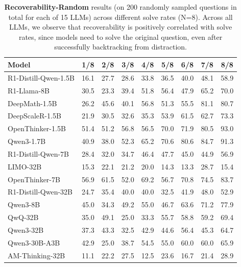 \documentclass{article} %
\begin{document}
\begin{table}[t]
  \centering
  \small
  \begin{tabular}{l|cccccccc}
    \toprule
    \textbf{Model} &
    \textbf{1/8} & \textbf{2/8} & \textbf{3/8} & \textbf{4/8} &
    \textbf{5/8} & \textbf{6/8} & \textbf{7/8} & \textbf{8/8} \\
    \midrule
    R1-Distill-Qwen-1.5B        & 16.1 & 27.7 & 28.6 & 33.8 & 36.5 & 40.0 & 48.1 & 58.9 \\
    R1-Llama-8B         & 30.5 & 23.3 & 39.4 & 51.8 & 56.4 & 47.9 & 65.2 & 70.0 \\
    DeepMath-1.5B       & 26.2 & 45.6 & 40.1 & 56.8 & 51.3 & 55.5 & 81.1 & 80.7 \\
    DeepScaleR-1.5B     & 21.9 & 30.5 & 32.6 & 35.3 & 53.9 & 61.5 & 62.7 & 73.3 \\
    OpenThinker-1.5B    & 51.4 & 51.2 & 56.8 & 56.5 & 70.0 & 71.9 & 80.5 & 93.0 \\
    Qwen3-1.7B          & 40.9 & 38.0 & 52.3 & 65.2 & 70.6 & 80.6 & 84.7 & 91.3 \\
    \midrule
    R1-Distill-Qwen-7B          & 28.4 & 32.0 & 34.7 & 46.4 & 47.7 & 45.0 & 44.9 & 56.9 \\
    LIMO-32B            & 15.3 & 22.1 & 21.2 & 20.0 & 14.3 & 13.3 & 28.7 & 15.4 \\
    OpenThinker-7B      & 56.9 & 61.5 & 52.0 & 69.2 & 56.7 & 70.8 & 74.5 & 83.7 \\
    R1-Distill-Qwen-32B         & 24.7 & 35.4 & 40.0 & 40.0 & 32.5 & 41.9 & 48.0 & 52.9 \\
    \midrule
    Qwen3-8B            & 45.0 & 34.3 & 49.2 & 55.0 & 46.7 & 63.6 & 71.2 & 77.9 \\
    QwQ-32B             & 35.0 & 49.1 & 25.0 & 33.3 & 55.7 & 58.8 & 59.2 & 69.4 \\
    Qwen3-32B           & 37.3 & 43.3 & 32.5 & 42.9 & 44.6 & 56.4 & 45.3 & 64.7 \\
    Qwen3-30B-A3B           & 42.9 & 25.0 & 38.7 & 54.5 & 55.0 & 60.0 & 60.0 & 65.9 \\
    AM-Thinking-32B     & 11.1 & 22.2 & 27.5 & 12.5 & 23.6 & 16.7 & 21.4 & 28.9 \\
    \bottomrule
  \end{tabular}
  \caption{\textbf{Recoverability-Random} results (on 200 randomly sampled questions in total for each of 15 LLMs) across different solve rates (N=8). Across all LLMs, we observe that recoverability is positively correlated with solve rates, since models need to solve the original question, even after successfully backtracking from distraction.}
  \label{tab:sr_curve_results}
\end{table}
\end{document}
